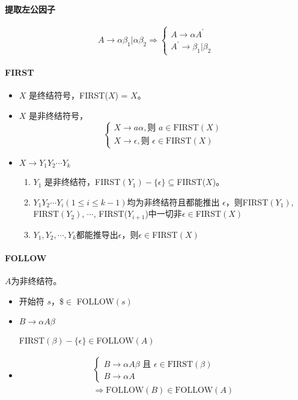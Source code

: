 \documentclass[10pt]{article}
\begin{document}
\begin{multicols}{3}
		\paragraph{提取左公因子}
		\begin{equation*}
			A\rightarrow \alpha\beta_1|\alpha\beta_2 \Rightarrow \begin{cases}
				A\rightarrow \alpha A^\prime \\
				A^\prime \rightarrow \beta_1 |\beta_2
			\end{cases}
		\end{equation*}
		\paragraph{FIRST}
		\begin{itemize}
			\item $X$ 是终结符号，FIRST($X$) = $X$。
			\item $X$ 是非终结符号，
			\begin{equation*}
				\begin{cases}
					X\rightarrow a\alpha,\text{则 }a\in\text{FIRST}(X)\\
					X\rightarrow \epsilon,\text{则 }\epsilon \in\text{FIRST}(X)
				\end{cases}
			\end{equation*}
			\item $X\rightarrow Y_1Y_2\cdots Y_k$
			\begin{enumerate}
				\item $Y_1$ 是非终结符，FIRST$(Y_1)-\{\epsilon\}\subseteq$FIRST($X$)。
				\item $Y_1Y_2\cdots Y_i(1\leq i\leq k-1)$均为非终结符且都能推出 $\epsilon$，则FIRST$(Y_1)$, FIRST$(Y_2)$, $\cdots$, FIRST($Y_{i+1}$)中一切非$\epsilon\in$FIRST$(X)$
				\item $Y_1,Y_2,\cdots,Y_k$都能推导出$\epsilon$，则$\epsilon\in$FIRST$(X)$
			\end{enumerate}
		\end{itemize}
		\paragraph{FOLLOW}
		$A$为非终结符。
		\begin{itemize}
			\item 开始符 $s$，\$$\in$ FOLLOW$(s)$
			\item $B\rightarrow \alpha A\beta$
			
			FIRST$(\beta)-\{\epsilon\}\in$FOLLOW$(A)$
			\item 
			\begin{align*}
				\begin{cases}
					B\rightarrow \alpha A\beta\text{ 且 }\epsilon\in\text{FIRST}(\beta)\\
					B\rightarrow \alpha A
				\end{cases}\\
				\Rightarrow\text{FOLLOW}(B)\in\text{FOLLOW}(A)
			\end{align*}
		\end{itemize}

\end{multicols}
\end{document}
